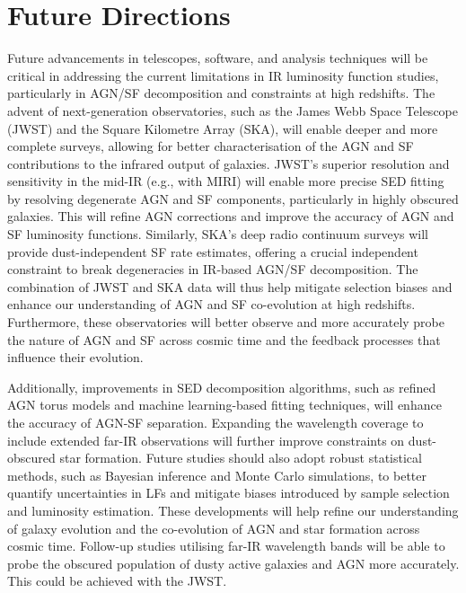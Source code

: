\section{Future Directions} \label{Sec: Future Directions}
Future advancements in telescopes, software, and analysis techniques will be critical in addressing the current limitations in IR luminosity function studies, particularly in AGN/SF decomposition and constraints at high redshifts. The advent of next-generation observatories, such as the James Webb Space Telescope (JWST) and the Square Kilometre Array (SKA), will enable deeper and more complete surveys, allowing for better characterisation of the AGN and SF contributions to the infrared output of galaxies. JWST’s superior resolution and sensitivity in the mid-IR (e.g., with MIRI) will enable more precise SED fitting by resolving degenerate AGN and SF components, particularly in highly obscured galaxies. This will refine AGN corrections and improve the accuracy of AGN and SF luminosity functions. Similarly, SKA’s deep radio continuum surveys will provide dust-independent SF rate estimates, offering a crucial independent constraint to break degeneracies in IR-based AGN/SF decomposition. The combination of JWST and SKA data will thus help mitigate selection biases and enhance our understanding of AGN and SF co-evolution at high redshifts. Furthermore, these observatories will better observe and more accurately probe the nature of AGN and SF across cosmic time and the feedback processes that influence their evolution.

Additionally, improvements in SED decomposition algorithms, such as refined AGN torus models and machine learning-based fitting techniques, will enhance the accuracy of AGN-SF separation. Expanding the wavelength coverage to include extended far-IR observations will further improve constraints on dust-obscured star formation. Future studies should also adopt robust statistical methods, such as Bayesian inference and Monte Carlo simulations, to better quantify uncertainties in LFs and mitigate biases introduced by sample selection and luminosity estimation. These developments will help refine our understanding of galaxy evolution and the co-evolution of AGN and star formation across cosmic time. Follow-up studies utilising far-IR wavelength bands will be able to probe the obscured population of dusty active galaxies and AGN more accurately. This could be achieved with the JWST.

